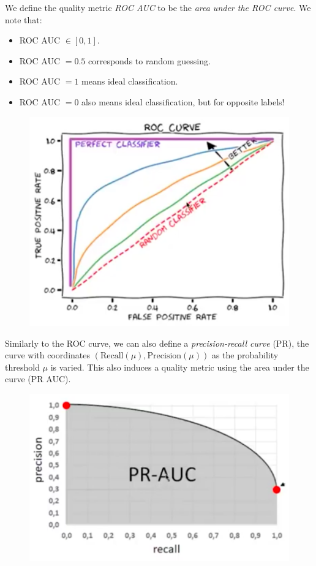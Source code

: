 \begin{framedef}
We define the quality metric \textit{ROC AUC} to be the \textit{area under the ROC curve}. We note that:
\begin{itemize}
\item ROC AUC $\in [0,1]$.
\item ROC AUC $= 0.5$ corresponds to random guessing.
\item ROC AUC $=1$ means ideal classification.
\item ROC AUC $=0$ also means ideal classification, but for opposite labels!
\end{itemize}

\begin{figure}[H]
\centering
\includegraphics[scale=0.4]{roccurveinterpretation.png}
\end{figure}
\end{framedef}

Similarly to the ROC curve, we can also define a \textit{precision-recall curve} (PR), the curve with coordinates $(\text{Recall}(\mu), \text{Precision}(\mu))$ as the probability threshold $\mu$ is varied. This also induces a quality metric using the area under the curve (PR AUC).

\begin{figure}[H]
\centering
\includegraphics[scale=0.4]{prcurve.png}
\end{figure}



